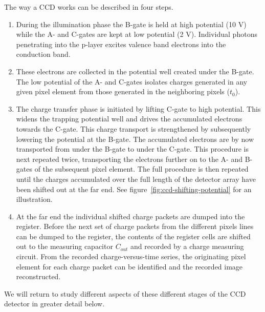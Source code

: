 The way a CCD works can be described in four steps.
\begin{enumerate}
	\item During the illumination phase 
		the B-gate is held at high potential
(10 V) while the A- and C-gates are kept at low potential (2
V). Individual photons penetrating into the p-layer excites valence
band electrons into the conduction band.

\item These electrons are collected in the potential well created under
the B-gate. The low potential of the A- and C-gates isolates charges
generated in any given pixel element from those generated in the
neighboring pixels ($t_0$). 

\item The charge transfer phase is initiated by lifting C-gate to high
potential. This widens the trapping potential well and drives the
accumulated electrons towards the C-gate. This charge transport is
strengthened by subsequently lowering the potential at the B-gate. The
accumulated electrons are by now transported from under the B-gate to
under the C-gate. This procedure is next repeated twice, transporting
the electrons further on to the A- and B-gates of the subsequent pixel
element. The full procedure is then repeated until the charges
accumulated over the full length of the detector array have been
shifted out at the far end. See figure~\ref{fig:ccd-shifting-potential} for
an illustration.

\item At the far end the individual shifted charge packets are dumped into
the register. Before the next set of charge packets from the different
pixels lines can be dumped to the register, the contents of the
register cells are shifted out to the measuring capacitor $C_{out}$ and
recorded by a charge measuring circuit. From the recorded
charge-versus-time series, the originating pixel element for each
charge packet can be identified and the recorded image reconstructed.
\end{enumerate}

We will return to study different aspects of these different stages of
the CCD detector in greater detail below.

